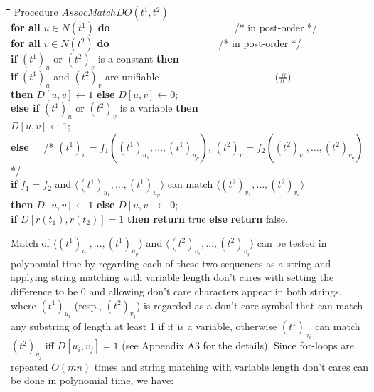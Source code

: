 \documentclass[a4paper]{llncs}
\begin{document}
\begin{rm}
\begin{tabbing}
\quad \= \quad \= \quad \= \quad \= \quad \= \quad \= \quad \= \kill
\> Procedure $AssocMatchDO(t^1,t^2)$\\
\> \> {\bf for all} $u \in N(t^1)$ {\bf do}~~~~~~~~~~~~~~~~~~~~~~~~~/* in post-order */ \\
\> \> \> {\bf for all} $v \in N(t^2)$ {\bf do}~~~~~~~~~~~~~~~~~~~~~~/* in post-order */ \\
\> \> \> \> {\bf if} $(t^1)_u$ or $(t^2)_v$ is a constant {\bf then}\\
\> \> \> \> \> {\bf if} $(t^1)_u$ and $(t^2)_v$ are unifiable ~~~~~~~~~~~~~~~~~~~~~~-(\#) \\
\> \> \> \> \> {\bf then} $D[u,v] \leftarrow 1$ {\bf else} 
$D[u,v] \leftarrow 0$;\\
\> \> \> \> {\bf else if} $(t^1)_u$ or $(t^2)_v$ is a variable {\bf then}\\
\> \> \> \> \> $D[u,v] \leftarrow 1$;\\
\> \> \> \> {\bf else}~~~/* $(t^1)_u = f_1((t^1)_{u_1},\ldots,(t^1)_{u_p})$,
$(t^2)_v = f_2((t^2)_{v_1},\ldots,(t^2)_{v_q})$ */\\
\> \> \> \> \> {\bf if} $f_1 = f_2$ and 
$\langle (t^1)_{u_1},\ldots,(t^1)_{u_p} \rangle$ can match $\langle (t^2)_{v_1},\ldots,(t^2)_{v_q} \rangle$  \\
\> \> \> \> \> {\bf then} $D[u,v] \leftarrow 1$ {\bf else} $D[u,v] \leftarrow 0$; \\
\> \> {\bf if} $D[r(t_1),r(t_2)]=1$
{\bf then} {\bf return} true {\bf else} {\bf return} false.
\end{tabbing}
\end{rm}

Match of $\langle (t^1)_{u_1},\ldots,(t^1)_{u_p} \rangle$ 
and $\langle (t^2)_{v_1},\ldots,(t^2)_{v_q} \rangle$ can be tested in
polynomial time by regarding each of these two sequences as a string
and applying string matching with variable length don't cares
\cite{akutsu96} with setting the difference to be 0 and allowing don't
care characters appear in both strings,
where
$(t^1)_{u_i}$ (resp., $(t^2)_{v_j}$) is regarded as a don't care symbol
that can match any substring of length at least 1 if it is a variable,
otherwise $(t^1)_{u_i}$ can match $(t^2)_{v_j}$ iff $D[u_i,v_j]=1$
(see Appendix A3 for the details).
Since for-loops are repeated $O(mn)$ times and
string matching with variable length don't cares can be done in polynomial time,
we have:
\end{document}
